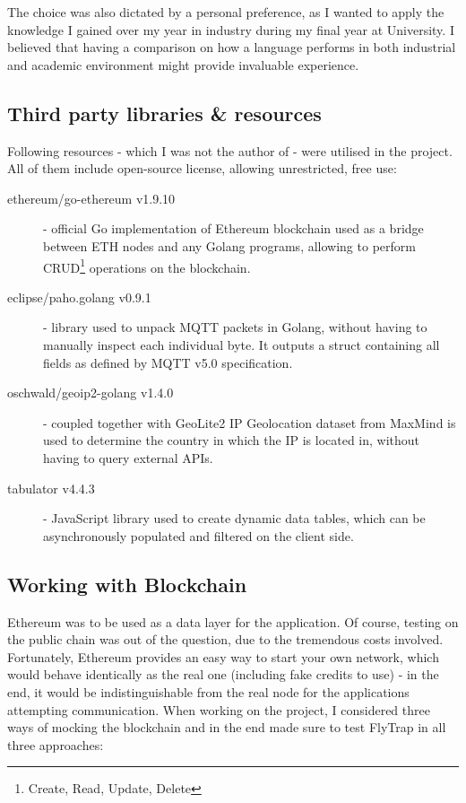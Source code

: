 The choice was also dictated by a personal preference, as I wanted to apply the knowledge I gained over my year in industry during my final year at University. I believed that having a comparison on how a language performs in both industrial and academic environment might provide invaluable experience.
\subsection{Third party libraries \& resources}\label{sec:tpp}
Following resources - which I was not the author of - were utilised in the project. All of them include open-source license, allowing unrestricted, free use:
\begin{description}
  \item[ethereum/go-ethereum v1.9.10] \cite{ethereum2017official} - official Go implementation of Ethereum blockchain used as a bridge between ETH nodes and any Golang programs, allowing to perform CRUD\footnote{Create, Read, Update, Delete} operations on the blockchain.
    \item[eclipse/paho.golang v0.9.1] \cite{pahogolang} - library used to unpack MQTT packets in Golang, without having to manually inspect each individual byte. It outputs a struct containing all fields as defined by MQTT v5.0 specification.
    \item[oschwald/geoip2-golang v1.4.0] \cite{geoip2} - coupled together with GeoLite2 IP Geolocation dataset from MaxMind \cite{maxmind} is used to determine the country in which the IP is located in, without having to query external APIs. 
    \item[tabulator v4.4.3] \cite{tabulator} - JavaScript library used to create dynamic data tables, which can be asynchronously populated and filtered on the client side.
\end{description}

\subsection{Working with Blockchain}
Ethereum was to be used as a data layer for the application. Of course, testing on the public chain was out of the question, due to the tremendous costs involved. Fortunately, Ethereum provides an easy way to start your own network, which would behave identically as the real one (including fake credits to use) - in the end, it would be indistinguishable from the real node for the applications attempting communication. When working on the project, I considered three ways of mocking the blockchain and in the end made sure to test FlyTrap in all three approaches:
